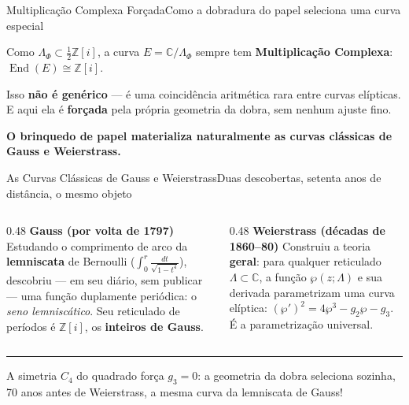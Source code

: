 \documentclass[aspectratio=169, 11pt, utf8]{beamer}
\begin{document}
\begin{frame}{Multiplicação Complexa Forçada}{Como a dobradura do papel seleciona uma curva especial}
  \vspace{0.3cm}
  \begin{center}
    \begin{block}{}
      \centering \large
      Como $\Lambda_\Phi \subset \frac{1}{2}\mathbb{Z}[i]$, a curva
      $E = \mathbb{C}/\Lambda_\Phi$ sempre tem \textbf{Multiplicação
      Complexa}: $\operatorname{End}(E) \cong \mathbb{Z}[i]$.
    \end{block}
    \vspace{0.4cm}

    {\normalsize Isso \textbf{não é genérico} --- é uma coincidência
    aritmética rara entre curvas elípticas. E aqui ela é
    \textbf{forçada} pela própria geometria da dobra, sem nenhum
    ajuste fino.}
    \vspace{0.3cm}

    {\large\color{EnimarNavy}\textbf{O brinquedo de papel materializa
    naturalmente as curvas clássicas de Gauss e Weierstrass.}}
  \end{center}
\end{frame}

\begin{frame}{As Curvas Clássicas de Gauss e Weierstrass}{Duas descobertas, setenta anos de distância, o mesmo objeto}
  \begin{columns}[t, onlytextwidth]
    \begin{column}{0.48\textwidth}
      \textbf{\color{EnimarNavy}Gauss (por volta de 1797)}
      \small
      Estudando o comprimento de arco da \textbf{lemniscata} de Bernoulli
      ($\int_0^r \frac{dt}{\sqrt{1-t^4}}$), descobriu --- em seu diário,
      sem publicar --- uma função duplamente periódica: o
      \textit{seno lemniscático}. Seu reticulado de períodos é
      $\mathbb{Z}[i]$, os \textbf{inteiros de Gauss}.
    \end{column}
    \begin{column}{0.48\textwidth}
      \textbf{\color{EnimarNavy}Weierstrass (décadas de 1860--80)}
      \small
      Construiu a teoria \textbf{geral}: para qualquer reticulado
      $\Lambda\subset\mathbb{C}$, a função $\wp(z;\Lambda)$ e sua
      derivada parametrizam uma curva elíptica:
      $(\wp')^2 = 4\wp^3 - g_2\wp - g_3$. É a parametrização universal.
    \end{column}
  \end{columns}
  \vspace{0.25cm}
  \begin{center}
    {\color{EnimarTeal!40}\rule{9cm}{0.8pt}}
    \vspace{0.20cm}

    \small A simetria $C_4$ do quadrado força $g_3 = 0$: a geometria da dobra seleciona sozinha, 70 anos antes de Weierstrass, a mesma curva da lemniscata de Gauss!
  \end{center}
\end{frame}
\end{document}
